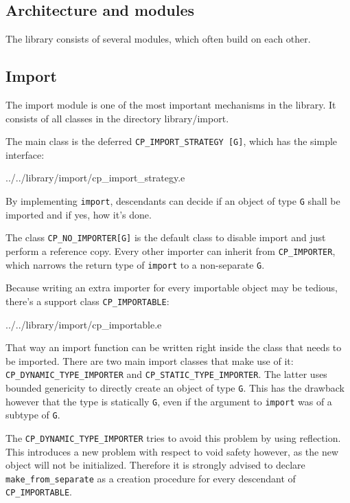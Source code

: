 \documentclass[a4paper,10pt]{report}
\newcommand{\dir} [1] [] {#1}
\begin{document}


\subsection {Architecture and modules}
\label{sec:modules}

The library consists of several modules, which often build on each other.

\subsection{Import}

The import module is one of the most important mechanisms in the library.
It consists of all classes in the directory \dir{library/import}.

The main class is the deferred \lstinline!CP_IMPORT_STRATEGY [G]!, which has the simple interface:


 {../../library/import/cp_import_strategy.e}

By implementing \lstinline!import!, descendants can decide if an object of type \lstinline!G! shall be imported and if yes, how it's done.

The class \lstinline!CP_NO_IMPORTER[G]! is the default class to disable import and just perform a reference copy.
Every other importer can inherit from \lstinline!CP_IMPORTER!, which narrows the return type of \lstinline!import! to a non-separate \lstinline!G!.

Because writing an extra importer for every importable object may be tedious, there's a support class \lstinline!CP_IMPORTABLE!:

 {../../library/import/cp_importable.e}

That way an import function can be written right inside the class that needs to be imported.
There are two main import classes that make use of it: \lstinline!CP_DYNAMIC_TYPE_IMPORTER! and \lstinline!CP_STATIC_TYPE_IMPORTER!.
The latter uses bounded genericity to directly create an object of type \lstinline!G!.
This has the drawback however that the type is statically \lstinline!G!, even if the argument to \lstinline!import! was of a subtype of \lstinline!G!.

The \lstinline!CP_DYNAMIC_TYPE_IMPORTER! tries to avoid this problem by using reflection.
This introduces a new problem with respect to void safety however, as the new object will not be initialized.
Therefore it is strongly advised to declare \lstinline!make_from_separate! as a creation procedure for every descendant of \lstinline!CP_IMPORTABLE!.
\end{document}
